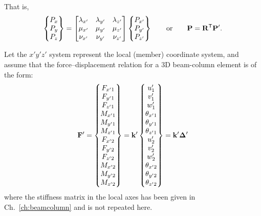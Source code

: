 That is,
\begin{equation}
  \begin{Bmatrix}P_x\\ P_y\\ P_z\end{Bmatrix} = \begin{bmatrix}\lambda_{x'} & \lambda_{y'} & \lambda_{z'}\\ \mu_{x'} & \mu_{y'} & \mu_{z'}\\ \nu_{x'} & \nu_{y'} & \nu_{z'}\end{bmatrix}\begin{Bmatrix}P_{x'}\\ P_{y'}\\ P_{z'}\end{Bmatrix}
  \qquad\text{or}\qquad \mathbf{P} = \mathbf{R}^{\mathsf{T}}\mathbf{P}'.
\end{equation}

Let the $x'y'z'$ system represent the local (member) coordinate system, and assume that the force--displacement relation for a 3D beam-column element is of the form:
\begin{equation}
  \mathbf{F}' = \begin{Bmatrix}F_{x'1}\\ F_{y'1}\\ F_{z'1}\\ M_{x'1}\\ M_{y'1}\\ M_{z'1}\\ F_{x'2}\\ F_{y'2}\\ F_{z'2}\\ M_{x'2}\\ M_{y'2}\\ M_{z'2}\end{Bmatrix}
  = \mathbf{k}'\begin{Bmatrix}u_1'\\ v_1'\\ w_1'\\ \theta_{x'1}\\ \theta_{y'1}\\ \theta_{z'1}\\ u_2'\\ v_2'\\ w_2'\\ \theta_{x'2}\\ \theta_{y'2}\\ \theta_{z'2}\end{Bmatrix} = \mathbf{k}'\bm{\Delta}'
\end{equation}
where the stiffness matrix in the local axes has been given in Ch.~\ref{ch:beamcolumn} and is not repeated here.

